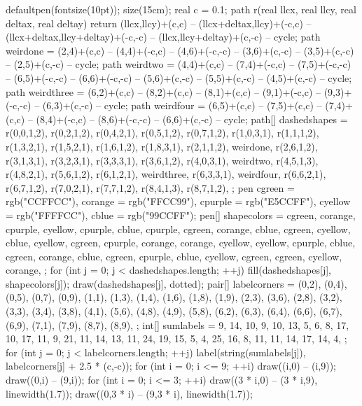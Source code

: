 	\begin{center}
		\begin{asy}
			defaultpen(fontsize(10pt));
			size(15cm);
			real c = 0.1;
			path r(real llcx, real llcy, real deltax, real deltay) {
				return (llcx,llcy)+(c,c) -- (llcx+deltax,llcy)+(-c,c) -- (llcx+deltax,llcy+deltay)+(-c,-c) -- (llcx,llcy+deltay)+(c,-c) -- cycle;
			}
			path weirdone = (2,4)+(c,c) -- (4,4)+(-c,c) -- (4,6)+(-c,-c) -- (3,6)+(c,-c) -- (3,5)+(c,-c) -- (2,5)+(c,-c) -- cycle;
			path weirdtwo = (4,4)+(c,c) -- (7,4)+(-c,c) -- (7,5)+(-c,-c) -- (6,5)+(-c,-c) -- (6,6)+(-c,-c) -- (5,6)+(c,-c) -- (5,5)+(c,-c) -- (4,5)+(c,-c) -- cycle;
			path weirdthree = (6,2)+(c,c) -- (8,2)+(c,c) -- (8,1)+(c,c) -- (9,1)+(-c,c) -- (9,3)+(-c,-c) -- (6,3)+(c,-c) -- cycle;
			path weirdfour = (6,5)+(c,c) -- (7,5)+(c,c) -- (7,4)+(c,c) -- (8,4)+(-c,c) -- (8,6)+(-c,-c) -- (6,6)+(c,-c) -- cycle;
			path[] dashedshapes = {
				r(0,0,1,2), r(0,2,1,2), r(0,4,2,1), r(0,5,1,2), r(0,7,1,2),
				r(1,0,3,1), r(1,1,1,2), r(1,3,2,1), r(1,5,2,1), r(1,6,1,2), r(1,8,3,1),
				r(2,1,1,2), weirdone, r(2,6,1,2),
				r(3,1,3,1), r(3,2,3,1), r(3,3,3,1), r(3,6,1,2),
				r(4,0,3,1), weirdtwo, r(4,5,1,3), r(4,8,2,1),
				r(5,6,1,2),
				r(6,1,2,1), weirdthree, r(6,3,3,1), weirdfour, r(6,6,2,1), r(6,7,1,2),
				r(7,0,2,1), r(7,7,1,2),
				r(8,4,1,3), r(8,7,1,2),
			};
			pen cgreen = rgb("CCFFCC"), corange = rgb("FFCC99"), cpurple = rgb("E5CCFF"), cyellow = rgb("FFFFCC"), cblue = rgb("99CCFF");
			pen[] shapecolors = {
				cgreen, corange, cpurple, cyellow, cpurple,
				cblue, cpurple, cgreen, corange, cblue, cgreen,
				cyellow, cblue, cyellow,
				cgreen, cpurple, corange, corange,
				cyellow, cyellow, cpurple, cblue,
				cgreen,
				corange, cblue, cgreen, cpurple, cblue, cyellow,
				cgreen, cgreen,
				cyellow, corange,
			};
			for (int j = 0; j < dashedshapes.length; ++j) {
				fill(dashedshapes[j], shapecolors[j]);
				draw(dashedshapes[j], dotted);
			}
			pair[] labelcorners = {
				(0,2), (0,4), (0,5), (0,7), (0,9),
				(1,1), (1,3), (1,4), (1,6), (1,8), (1,9),
				(2,3), (3,6), (2,8),
				(3,2), (3,3), (3,4), (3,8),
				(4,1), (5,6), (4,8), (4,9),
				(5,8),
				(6,2), (6,3), (6,4), (6,6), (6,7), (6,9),
				(7,1), (7,9),
				(8,7), (8,9),
			};
			int[] sumlabels = {
				9, 14, 10, 9, 10,
				13, 5, 6, 8, 17, 10,
				17, 11, 9,
				21, 11, 14, 13,
				11, 24, 19, 15,
				5,
				4, 25, 16, 8, 11, 11,
				14, 17,
				14, 4,
			};
			for (int j = 0; j < labelcorners.length; ++j) label(string(sumlabels[j]), labelcorners[j] + 2.5 * (c,-c));
			for (int i = 0; i <= 9; ++i) {
				draw((i,0) -- (i,9));
				draw((0,i) -- (9,i));
			}
			for (int i = 0; i <= 3; ++i) {
				draw((3 * i,0) -- (3 * i,9), linewidth(1.7));
				draw((0,3 * i) -- (9,3 * i), linewidth(1.7));
			}
		\end{asy}
	\end{center}